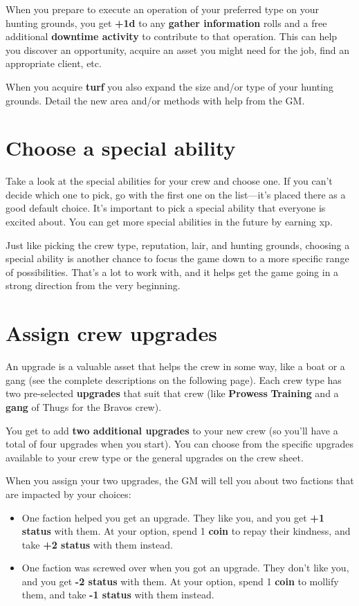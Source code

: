 \documentclass[11pt,oneside]{book}
\newcommand{\gameterm}[1]{\textbf{#1}}
\begin{document}
When you prepare to execute an operation of your preferred type on your hunting grounds, you  get \textbf{+1d} to any \textbf{gather information} rolls and a free additional \textbf{downtime activity} to contribute to that operation. This can help you discover an opportunity, acquire an asset you might need for the job, find an appropriate client, etc.

When you acquire \textbf{turf} you also expand the size and/or type of your hunting grounds. Detail the new area and/or methods with help from the GM.

\section{Choose a special ability}

Take a look at the special abilities for your crew and choose one. If you can’t decide which one to pick, go with the first one on the list---it’s placed there as a good default choice. It’s important to pick a special ability that everyone is excited about. You can get more special abilities in the future by earning xp.

Just like picking the crew type, reputation, lair, and hunting grounds, choosing a special ability is another chance to focus the game down to a more specific range of possibilities. That’s a lot to work with, and it helps get the game going in a strong direction from the very beginning.

\section{Assign crew upgrades}

An upgrade is a valuable asset that helps the crew in some way, like a boat or a gang (see the complete descriptions on the following page). Each crew type has two pre-selected \textbf{upgrades} that suit that crew (like \textbf{Prowess} \textbf{Training} and a\textbf{ gang} of Thugs for the Bravos crew).

You get to add \textbf{two additional upgrades} to your new crew (so you’ll have a total of four upgrades when you start). You can choose from the specific upgrades available to your crew type or the general upgrades on the crew sheet.

When you assign your two upgrades, the GM will tell you about two factions that are impacted by your choices:

\begin{itemize}
	\item One faction helped you get an upgrade. They like you, and you get \textbf{+1 status} with them. At your option, spend 1 \gameterm{coin } to repay their kindness, and take \textbf{+2 status} with them instead.
	\item One faction was screwed over when you got an upgrade. They don’t like you, and you get \textbf{-2 status} with them. At your option, spend 1 \gameterm{coin } to mollify them, and take \textbf{-1 status} with them instead.
\end{itemize}
\end{document}
